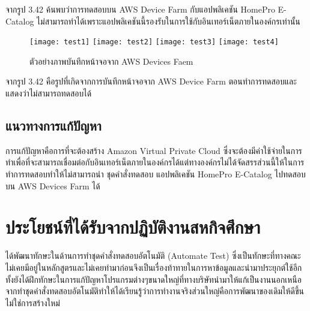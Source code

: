 จากรูป 3.42 ค้นพบว่าการทดสอบบน AWS Device Farm กับแอปพลิเคชัน HomePro E-Catalog ไม่สามารถทำได้เพราะแอปพลิเคชันนี้รองรับในการใช้กับอินเทอร์เน็ตภายในองค์กรเท่านั้น


\begin{figure}[H]
    \centering
    \texttt{[image: test1]}
    \texttt{[image: test2]}
    \texttt{[image: test3]}
    \texttt{[image: test4]}
    \caption{ตัวอย่างภาพบันทึกหน้าจอจาก AWS Devices Faem}
    \label{Fig:90}
\end{figure}

จากรูป 3.42 คือรูปที่เกิดจากการบันทึกหน้าจอจาก AWS Device Farm ตอนทำการทดสอบและแสดงว่าไม่สามารถทดสอบได้

\subsection{แนวทางการแก้ปัญหา}
การแก้ปัญหาคือการที่จะต้องสร้าง Amazon Virtual Private Cloud ซึ่งจะต้องมีค่าใช้จ่ายในการทำเพื่อที่จะสามารถเชื่อมต่อกับอินเทอร์เน็ตภายในองค์กรได้แต่ทางองค์กรไม่ได้จัดสรรส่วนนี้ให้ในการทำการทดสอบทำให้ไม่สามารถนำ ชุดคำสั่งทดสอบ แอปพลิเคชัน HomePro E-Catalog ไปทดสอบบน AWS Devices Farm ได้


\section{ประโยชน์ที่ได้รับจากปฏิบัติงานสหกิจศึกษา}
ได้พัฒนาทักษะในด้านการทำชุดคำสั่งทดสอบอัตโนมัติ (Automate Test) ซึ่งเป็นทักษะที่ทางคณะไม่เคยมีอยู่ในหลักสูตรและไม่เคยทำมาก่อนจึงเป็นเรื่องท้าทายในการหาข้อมูลและนำมาประยุกต์ใช้อีกทั้งยังได้ฝึกทักษะในการแก้ปัญหาโปรแกรมต่างๆขนาดใหญ่ที่ทางบริษัทนำมาให้แก้เป็นงานนอกเหนือจากทำชุดคำสั่งทดสอบอัตโนมัติทำให้ได้เรียนรู้ว่าการทำงานจริงส่วนใหญ่คือการพัฒนาของเดิมให้ดีขึ้นไม่ใช่การสร้างใหม่